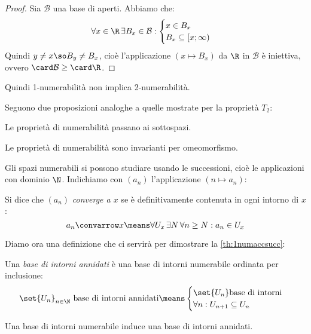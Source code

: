 \begin{proof}
	Sia $\mathcal B$ una base di aperti.
	Abbiamo che:
	\[\forall x\in\R\,\exists B_x\in\mathcal B:
	\begin{cases}
		x\in B_x\\
		B_x\subseteq [x;\infty)
	\end{cases}\]
	Quindi $y\neq x\so B_y\neq B_x$,
	cioè l'applicazione $(x\mapsto B_x)$ da $\R$ in $\mathcal B$ è iniettiva,
	ovvero $\card\mathcal B\geq\card\R$.
\end{proof}

\begin{oss}
	Quindi 1-numerabilità non implica 2-numerabilità.
\end{oss}

Seguono due proposizioni analoghe a quelle mostrate per la proprietà $T_2$:

\begin{prop}
	Le proprietà di numerabilità passano ai sottospazi.
\end{prop}

\begin{prop}
	Le proprietà di numerabilità sono invarianti per omeomorfismo.
\end{prop}

Gli spazi numerabili si possono studiare usando le successioni, cioè le applicazioni con dominio $\N$.
Indichiamo con $(a_n)$ l'applicazione $(n\mapsto a_n)$:

\begin{defn}[Convergenza]
	Si dice che $(a_n)$ \emph{converge a $x$} se è definitivamente contenuta in ogni intorno di $x$:
	\[a_n\convarrow x\means
	\forall U_x\,\exists N\,\forall n\geq N:a_n\in U_x\]
\end{defn}

Diamo ora una definizione che ci servirà per dimostrare la \autoref{th:1numaccsucc}:

\begin{defn}
	Una \emph{base di intorni annidati} è una base di intorni numerabile ordinata per inclusione:
	\[\set{U_n}_{n\in\N}\text{ base di intorni annidati}\means
	\begin{cases}
		\set{U_n}\text{base di intorni}\\
		\forall n:U_{n+1}\subseteq U_n
	\end{cases}\]
\end{defn}

\begin{prop}
	Una base di intorni numerabile induce una base di intorni annidati.
\end{prop}

